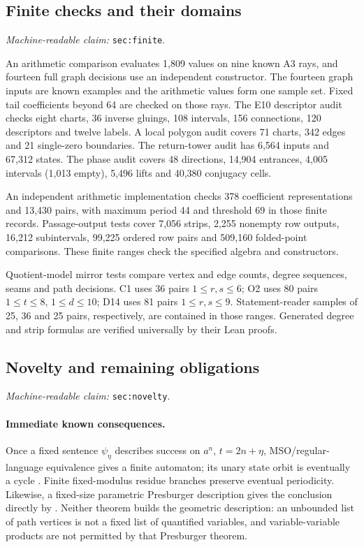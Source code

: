 \documentclass[11pt]{amsart}
\newcommand{\record}[1]{\nolinkurl{#1}}
\newcommand{\claimid}[1]{\par\nopagebreak\noindent\textit{Machine-readable claim:} \record{#1}.\par}
\theoremstyle{definition}\newtheorem{definition}{Definition}
\begin{document}
\subsection{Finite checks and their domains}\label{sec:finite}
\claimid{sec:finite}
An arithmetic comparison evaluates 1,809 values on nine known A3
rays, and fourteen full graph decisions use an independent constructor.
The fourteen graph inputs are known examples and the arithmetic
values form one sample set. Fixed tail coefficients beyond 64 are
checked on those rays. The E10 descriptor audit checks eight charts,
36 inverse gluings, 108 intervals, 156 connections, 120 descriptors
and twelve labels. A local polygon audit covers 71 charts, 342 edges
and 21 single-zero boundaries. The return-tower audit has 6,564
inputs and 67,312 states. The phase audit covers 48 directions,
14,904 entrances, 4,005 intervals (1,013 empty), 5,496 lifts and
40,380 conjugacy cells.

An independent arithmetic implementation checks 378 coefficient
representations and 13,430 pairs, with maximum period 44 and
threshold 69 in those finite records. Passage-output tests cover
7,056 strips, 2,255 nonempty row outputs, 16,212 subintervals,
99,225 ordered row pairs and 509,160 folded-point comparisons.
These finite ranges check the specified algebra and constructors.

Quotient-model mirror tests compare vertex and edge counts, degree
sequences, seams and path decisions. C1 uses 36 pairs $1\le r,s\le6$;
O2 uses 80 pairs $1\le t\le8$, $1\le d\le10$; D14 uses 81 pairs
$1\le r,s\le9$. Statement-reader samples of 25, 36 and 25 pairs,
respectively, are contained in those ranges. Generated degree and
strip formulas are verified universally by their Lean proofs.

\subsection{Novelty and remaining obligations}\label{sec:novelty}
\claimid{sec:novelty}
\paragraph{Immediate known consequences.}
Once a fixed sentence $\psi_\eta$ describes success on $a^n$,
$t=2n+\eta$, MSO/regular-language equivalence gives a finite automaton;
its unary state orbit is eventually a cycle \cite[Section 3.1]{MSO}.
Finite fixed-modulus residue branches preserve eventual periodicity.
Likewise, a fixed-size parametric Presburger description gives the
conclusion directly by \cite[Theorem 1.15]{BGW}. Neither theorem builds
the geometric description: an unbounded list of path vertices is not
a fixed list of quantified variables, and variable-variable products
are not permitted by that Presburger theorem.
\end{document}
